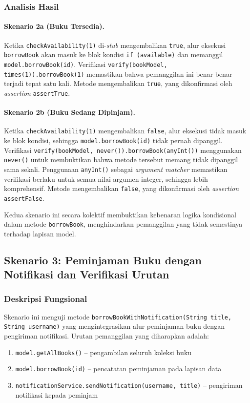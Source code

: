 \documentclass[12pt,a4paper]{article}
\begin{document}
\subsubsection{Analisis Hasil}

\paragraph{Skenario 2a (Buku Tersedia).}
Ketika \texttt{checkAvailability(1)} di-\textit{stub} mengembalikan
\texttt{true}, alur eksekusi \texttt{borrowBook} akan masuk ke blok kondisi
\texttt{if (available)} dan memanggil \texttt{model.borrowBook(id)}.
Verifikasi \texttt{verify(bookModel, times(1)).borrowBook(1)} memastikan bahwa
pemanggilan ini benar-benar terjadi tepat satu kali. Metode mengembalikan
\texttt{true}, yang dikonfirmasi oleh \textit{assertion} \texttt{assertTrue}.

\paragraph{Skenario 2b (Buku Sedang Dipinjam).}
Ketika \texttt{checkAvailability(1)} mengembalikan \texttt{false}, alur
eksekusi tidak masuk ke blok kondisi, sehingga \texttt{model.borrowBook(id)}
tidak pernah dipanggil. Verifikasi \texttt{verify(bookModel, never()).borrowBook(anyInt())}
menggunakan \texttt{never()} untuk membuktikan bahwa metode tersebut memang
tidak dipanggil sama sekali. Penggunaan \texttt{anyInt()} sebagai
\textit{argument matcher} memastikan verifikasi berlaku untuk semua nilai
argumen integer, sehingga lebih komprehensif. Metode mengembalikan
\texttt{false}, yang dikonfirmasi oleh \textit{assertion} \texttt{assertFalse}.

Kedua skenario ini secara kolektif membuktikan kebenaran logika kondisional
dalam metode \texttt{borrowBook}, menghindarkan pemanggilan yang tidak
semestinya terhadap lapisan model.

\subsection{Skenario 3: Peminjaman Buku dengan Notifikasi dan Verifikasi Urutan}

\subsubsection{Deskripsi Fungsional}

Skenario ini menguji metode \texttt{borrowBookWithNotification(String title,
String username)} yang mengintegrasikan alur peminjaman buku dengan pengiriman
notifikasi. Urutan pemanggilan yang diharapkan adalah:
\begin{enumerate}
    \item \texttt{model.getAllBooks()} -- pengambilan seluruh koleksi buku
    \item \texttt{model.borrowBook(id)} -- pencatatan peminjaman pada lapisan data
    \item \texttt{notificationService.sendNotification(username, title)} --
          pengiriman notifikasi kepada peminjam
\end{enumerate}
\end{document}
